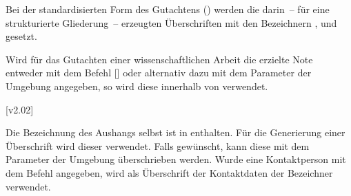 \begin{DeclareEntity}{}
\begin{Declaration}
  {}
\begin{Declaration}
  {}
\printdeclarationlist

Bei der standardisierten Form des Gutachtens () werden 
die darin~-- für eine strukturierte Gliederung~-- erzeugten Überschriften mit 
den Bezeichnern ,  und  
gesetzt.
%
\end{Declaration}
\end{Declaration}

\begin{Declaration}
  {}
\printdeclarationlist

Wird für das Gutachten einer wissenschaftlichen Arbeit die erzielte Note 
entweder mit dem Befehl [] oder alternativ dazu 
mit dem Parameter  der 
Umgebung  angegeben, so wird diese innerhalb von 
 verwendet.
%
\end{Declaration}

\begin{Declaration}
  {}
\begin{Declaration}
  {}
  [v2.02]
\printdeclarationlist

Die Bezeichnung des Aushangs selbst ist in  enthalten. Für 
die Generierung einer Überschrift wird dieser verwendet. Falls gewünscht, kann 
diese mit dem Parameter  der Umgebung 
 überschrieben werden. Wurde eine Kontaktperson mit dem 
Befehl  angegeben, wird als Überschrift der Kontaktdaten 
der Bezeichner  verwendet.
%
\end{Declaration}
\end{Declaration}
%
\end{DeclareEntity}
